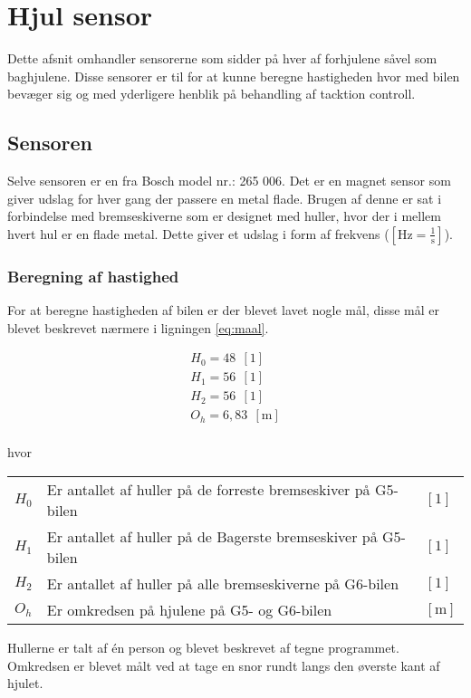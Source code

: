 \documentclass[12pt,a4paper]{report}
\begin{document}
\chapter{Hjul sensor}
Dette afsnit omhandler sensorerne som sidder på hver af forhjulene såvel som baghjulene. Disse sensorer er til for at kunne beregne hastigheden hvor med bilen bevæger sig og med yderligere henblik på behandling af tacktion controll.

\section{Sensoren}
Selve sensoren er en fra Bosch model nr.: 265 006. Det er en magnet sensor som giver udslag for hver gang der passere en metal flade. Brugen af denne er sat i forbindelse med bremseskiverne som er designet med huller, hvor der i mellem hvert hul er en flade metal. Dette giver et udslag i form af frekvens ($\left[\text{Hz} = \frac{1}{\text{s}}\right]$).

\subsection*{Beregning af hastighed}
For at beregne hastigheden af bilen er der blevet lavet nogle mål, disse mål er blevet beskrevet nærmere i ligningen \ref{eq:maal}.

\begin{center}
	\begin{subequations} \label{eq:maal}
		\begin{align}
H_{0} = 48 ~~ \left[\text{1}\right] \\
H_{1} = 56 ~~ \left[\text{1}\right] \\
H_{2} = 56 ~~ \left[\text{1}\right] \\
O_{h} = 6,83 ~~ \left[\text{m}\right] \\
		\end{align}	
	\end{subequations}
\end{center}
hvor
\begin{center}
	\begin{tabular}{ l l l }
	  $H_{0}$ & Er antallet af huller på de forreste bremseskiver på G5-bilen & $\left[1\right]$ \\
	  $H_{1}$ & Er antallet af huller på de Bagerste bremseskiver på G5-bilen & $\left[1\right]$\\
	  $H_{2}$ & Er antallet af huller på alle bremseskiverne på G6-bilen & $\left[1\right]$ \\
	  $O_{h}$ & Er omkredsen på hjulene på G5- og G6-bilen & $\left[\text{m}\right]$ \\
	\end{tabular}  
\end{center}  
Hullerne er talt af én person og blevet beskrevet af tegne programmet. Omkredsen er blevet målt ved at tage en snor rundt langs den øverste kant af hjulet.
\end{document}
